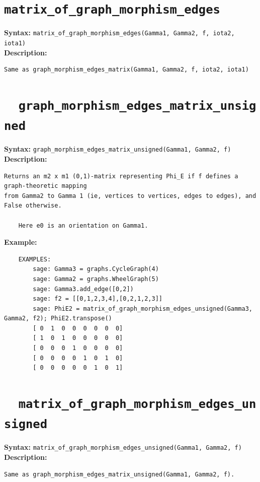 \documentclass{article}
\begin{document}
\section*{\tt matrix\_of\_graph\_morphism\_edges}

\textbf{Syntax:} \verb}matrix_of_graph_morphism_edges(Gamma1, Gamma2, f, iota2, iota1)}\\

\textbf{Description:}
\begin{verbatim}
Same as graph_morphism_edges_matrix(Gamma1, Gamma2, f, iota2, iota1)
\end{verbatim}

\section{\tt \ \ graph\_morphism\_edges\_matrix\_unsigned}

\textbf{Syntax:} \verb}graph_morphism_edges_matrix_unsigned(Gamma1, Gamma2, f)}\\

\textbf{Description:}
\begin{verbatim}
Returns an m2 x m1 (0,1)-matrix representing Phi_E if f defines a graph-theoretic mapping
from Gamma2 to Gamma 1 (ie, vertices to vertices, edges to edges), and False otherwise. 

    Here e0 is an orientation on Gamma1. 
\end{verbatim}

\textbf{Example:}
\begin{verbatim}
    EXAMPLES:
        sage: Gamma3 = graphs.CycleGraph(4)
        sage: Gamma2 = graphs.WheelGraph(5)
        sage: Gamma3.add_edge([0,2])
        sage: f2 = [[0,1,2,3,4],[0,2,1,2,3]]
        sage: PhiE2 = matrix_of_graph_morphism_edges_unsigned(Gamma3, Gamma2, f2); PhiE2.transpose()
        [ 0  1  0  0  0  0  0  0]
        [ 1  0  1  0  0  0  0  0]
        [ 0  0  0  1  0  0  0  0]
        [ 0  0  0  0  1  0  1  0]
        [ 0  0  0  0  0  1  0  1]
\end{verbatim}

\section{\tt \ \ matrix\_of\_graph\_morphism\_edges\_unsigned}

\textbf{Syntax:} \verb}matrix_of_graph_morphism_edges_unsigned(Gamma1, Gamma2, f)}\\

\textbf{Description:}
\begin{verbatim}
Same as graph_morphism_edges_matrix_unsigned(Gamma1, Gamma2, f).
\end{verbatim}
\end{document}

